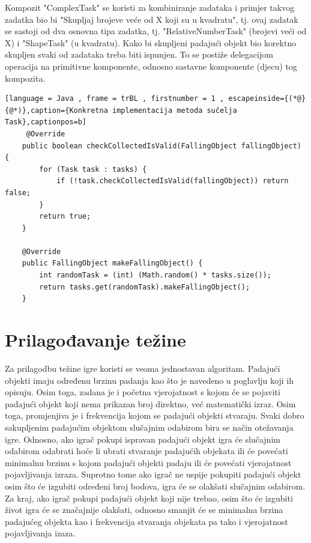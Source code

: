 \documentclass[times, utf8, zavrsni, numeric]{fer}
\begin{document}
	 Kompozit "ComplexTask" se koristi za kombiniranje zadataka i primjer takvog zadatka bio bi "Skupljaj brojeve veće od X koji su u kvadratu", tj. ovaj zadatak se sastoji od dva osnovna tipa zadatka, tj.
	 "RelativeNumberTask" (brojevi veći od X) i "ShapeTask" (u kvadratu). Kako bi skupljeni padajući objekt bio korektno skupljen svaki od zadataka treba biti ispunjen. To se postiže delegacijom operacija na primitivne
	 komponente, odnosno sastavne komponente (djecu) tog kompozita.
	 \renewcommand{\lstlistingname}{Kôd}
	\begin{lstlisting}[language = Java , frame = trBL , firstnumber = 1 , escapeinside={(*@}{@*)},caption={Konkretna implementacija metoda sučelja Task},captionpos=b]
	 @Override
    public boolean checkCollectedIsValid(FallingObject fallingObject) {
        for (Task task : tasks) {
            if (!task.checkCollectedIsValid(fallingObject)) return false;
        }
        return true;
    }

    @Override
    public FallingObject makeFallingObject() {
        int randomTask = (int) (Math.random() * tasks.size());
        return tasks.get(randomTask).makeFallingObject();
    }
	\end{lstlisting}
	
	\section{Prilagođavanje težine}
	Za prilagodbu težine igre koristi se veoma jednostavan algoritam. Padajući objekti imaju određenu brzinu padanja kao što je navedeno u poglavlju koji ih opisuju. Osim toga, zadana je i početna vjerojatnost 
	s kojom će se pojaviti padajući objekt koji nema prikazan broj direktno, već matematički izraz. Osim toga, promjenjiva je i frekvencija kojom se padajući objekti stvaraju. Svaki dobro sakupljenim padajućim objektom
	slučajnim odabirom bira se način otežavanja igre. Odnosno, ako igrač pokupi ispravan padajući objekt igra će slučajnim odabirom odabrati hoće li ubrati stvaranje padajućih objekata ili će povećati minimalnu brzinu
	s kojom padajući objekti padaju ili će povećati vjerojatnost pojavljivanja izraza.
	Suprotno tome ako igrač ne uspije pokupiti padajući objekt osim što će izgubiti određeni broj bodova, igra će se olakšati slučajnim odabirom. Za kraj, ako igrač pokupi padajući objekt koji nije trebao, osim što će
	izgubiti život igra će se značajnije olakšati, odnosno smanjit će se minimalna brzina padajućeg objekta kao i frekvencija stvaranja objekata pa tako i vjerojatnost pojavljivanja izaza.
	
\end{document}
